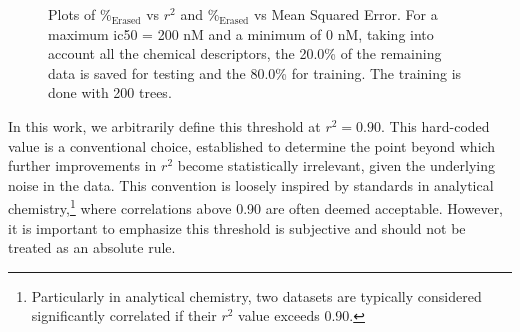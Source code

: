 \documentclass[11pt]{article}
\begin{document}
\begin{figure}[H]
\caption{Plots of $\%_{\text{Erased}}$ vs $r^2$ and $\%_{\text{Erased}}$ vs Mean Squared Error. For a maximum \gls{ic50} = 200 nM and a minimum of 0 nM,  taking into account all the chemical descriptors, the 20.0\% of the remaining data is saved for testing and the  80.0\% for training. The training is done with 200 trees.}
\label{FigPlotErasedPercentageVSRSquare}
\end{figure}

In this work, we arbitrarily define this threshold at $r^2 = 0.90$. This hard-coded value is a conventional choice, established to determine the point beyond which further improvements in $r^2$ become statistically irrelevant, given the underlying noise in the data. This convention is loosely inspired by standards in analytical chemistry,\footnote{Particularly in analytical chemistry, two datasets are typically considered significantly correlated if their $r^2$ value exceeds 0.90.} where correlations above 0.90 are often deemed acceptable. However, it is important to emphasize this threshold is subjective and should not be treated as an absolute rule.
\end{document}
